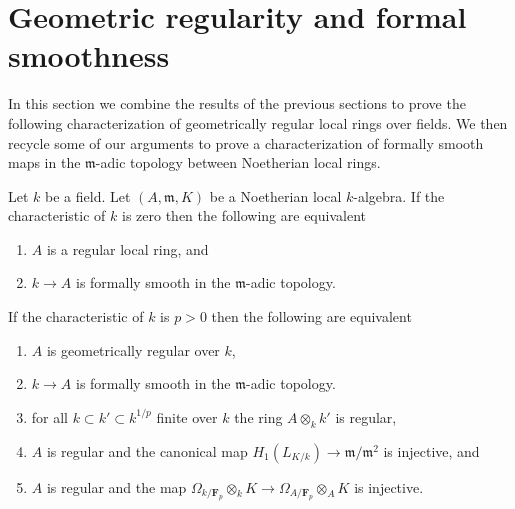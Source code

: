 \section{Geometric regularity and formal smoothness}
\label{section-regular-fs}

\noindent
In this section we combine the results of the previous
sections to prove the following characterization of geometrically
regular local rings over fields. We then recycle some of our
arguments to prove a characterization of formally smooth
maps in the $\mathfrak m$-adic topology between Noetherian local
rings.

\begin{theorem}
\label{theorem-regular-fs}
Let $k$ be a field. Let $(A, \mathfrak m, K)$ be a Noetherian local
$k$-algebra. If the characteristic of $k$ is zero then the following
are equivalent
\begin{enumerate}
\item $A$ is a regular local ring, and
\item $k \to A$ is formally smooth in the $\mathfrak m$-adic topology.
\end{enumerate}
If the characteristic of $k$ is $p > 0$ then the following are equivalent
\begin{enumerate}
\item $A$ is geometrically regular over $k$,
\item $k \to A$ is formally smooth in the $\mathfrak m$-adic topology.
\item for all $k \subset k' \subset k^{1/p}$
finite over $k$ the ring $A \otimes_k k'$ is regular,
\item $A$ is regular and the canonical map
$H_1(L_{K/k}) \to \mathfrak m/\mathfrak m^2$ is injective, and
\item $A$ is regular and the map
$\Omega_{k/\mathbf{F}_p} \otimes_k K \to \Omega_{A/\mathbf{F}_p} \otimes_A K$
is injective.
\end{enumerate}
\end{theorem}

